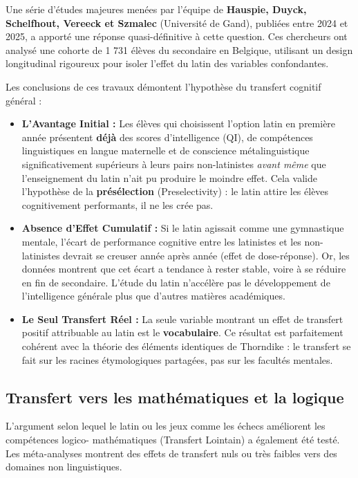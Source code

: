 Une série d'études majeures menées par l'équipe de \textbf{Hauspie, Duyck, Schelfhout, Vereeck et
Szmalec} (Université de Gand), publiées entre 2024 et 2025, a apporté une réponse quasi-définitive à
cette question. Ces chercheurs ont analysé une cohorte de 1 731 élèves du secondaire en Belgique,
utilisant un design longitudinal rigoureux pour isoler l'effet du latin des variables
confondantes.\cite{II-1-1-ref21}

Les conclusions de ces travaux démontent l'hypothèse du transfert cognitif général :

\begin{itemize}\item \textbf{L'Avantage Initial :} Les élèves qui choisissent l'option latin en première année présentent \textbf{déjà} des scores d'intelligence (QI), de compétences linguistiques en langue maternelle et de conscience métalinguistique significativement supérieurs à leurs pairs non-latinistes \textit{avant même} que l'enseignement du latin n'ait pu produire le moindre effet. Cela valide l'hypothèse de la \textbf{présélection} (Preselectivity) : le latin attire les élèves cognitivement performants, il ne les crée pas.\cite{II-1-1-ref21}\item \textbf{Absence d'Effet Cumulatif :} Si le latin agissait comme une gymnastique mentale, l'écart de performance cognitive entre les latinistes et les non-latinistes devrait se creuser année après année (effet de dose-réponse). Or, les données montrent que cet écart a tendance à rester stable, voire à se réduire en fin de secondaire. L'étude du latin n'accélère pas le développement de l'intelligence générale plus que d'autres matières académiques.\cite{II-1-1-ref24}\item \textbf{Le Seul Transfert Réel :} La seule variable montrant un effet de transfert positif attribuable au latin est le \textbf{vocabulaire}. Ce résultat est parfaitement cohérent avec la théorie des éléments identiques de Thorndike : le transfert se fait sur les racines étymologiques partagées, pas sur les facultés mentales.\cite{II-1-1-ref21}\end{itemize}

\subsection{Transfert vers les mathématiques et la logique}

L'argument selon lequel le latin ou les jeux comme les échecs améliorent les compétences logico-
mathématiques (Transfert Lointain) a également été testé. Les méta-analyses montrent des effets de
transfert nuls ou très faibles vers des domaines non linguistiques.

